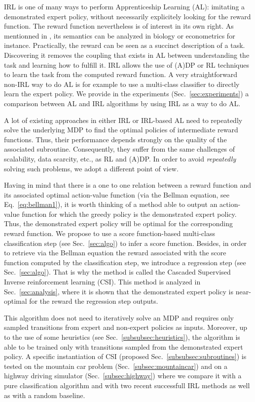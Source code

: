 \documentclass{llncs}
\begin{document}
IRL is one of many ways to perform Apprenticeship Learning (AL): imitating a demonstrated expert policy, without necessarily explicitely looking for the reward function. The reward function nevertheless is of interest in its own right. As mentionned in \cite{russell1998learning}, its semantics can be analyzed in biology or econometrics for instance. Practically, the reward can be seen as a succinct description of a task. Discovering it removes the coupling that exists in AL between understanding the task and learning how to fulfill it. IRL allows the use of (A)DP or RL techniques to learn the task from the computed reward function. A very straightforward non-IRL way to do AL is for example to use a multi-class classifier to directly learn the expert policy. We provide in the experiments (Sec.~\ref{sec:experiments}) a comparison between AL and IRL algorithms by using IRL as a way to do AL.

A lot of existing approaches in either IRL or IRL-based AL need to repeatedly solve the underlying MDP to find the optimal policies of intermediate reward functions. Thus, their performance depends strongly on the quality of the associated subroutine. Consequently, they suffer from the same challenges of scalability, data scarcity, etc., as RL and (A)DP. In order to avoid \emph{repeatedly} solving such problems, we adopt a different point of view.

Having in mind that there is a one to one relation between a reward function and its associated optimal action-value function (via the Bellman equation, see Eq.~\eqref{eq:bellman1}), it is worth thinking of a method able to output an action-value function for which the greedy policy is the demonstrated expert policy. Thus, the demonstrated expert policy will be optimal for the corresponding reward function. We propose to use a score function-based multi-class classification step (see Sec.~\ref{sec:algo}) to infer a score function. Besides, in order to retrieve via the Bellman equation the reward associated with the score function computed by the classification step, we introduce a regression step (see Sec.~\ref{sec:algo}). That is why the method is called the Cascaded Supervised Inverse reinforcement learning (CSI). This method is analyzed in Sec.~\ref{sec:analysis}, where it is shown that the demonstrated expert policy is near-optimal for the reward the regression step outputs.

This algorithm does not need to iteratively solve an MDP and requires only sampled transitions from expert and non-expert policies as inputs. Moreover, up to the use of some heuristics (see Sec.~\ref{subsubsec:heuristics}), the algorithm is able to be trained only with transitions sampled from the demonstrated expert policy. A specific instantiation of CSI (proposed Sec.~\ref{subsubsec:subroutines}) is tested on the mountain car problem (Sec.~\ref{subsec:mountaincar}) and on a highway driving simulator (Sec.~\ref{subsec:highway}) where we compare it with a pure classification algorithm \cite{taskar2005learning} and with two recent successfull IRL methods \cite{klein2012scirl} as well as with a random baseline.
\end{document}
